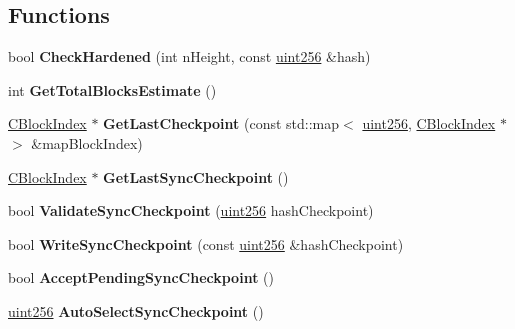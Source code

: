 \subsection*{Functions}
\begin{DoxyCompactItemize}
\item 
\mbox{\label{namespace_checkpoints_a896b098d769129c8e84c511f838baaa7}} 
bool {\bfseries Check\+Hardened} (int n\+Height, const \mbox{\hyperlink{classuint256}{uint256}} \&hash)
\item 
\mbox{\label{namespace_checkpoints_ac4dc0a0ba00009be52fee3eef694c2c0}} 
int {\bfseries Get\+Total\+Blocks\+Estimate} ()
\item 
\mbox{\label{namespace_checkpoints_ad91375160e77c30d6e6ccbfe1c682195}} 
\mbox{\hyperlink{class_c_block_index}{C\+Block\+Index}} $\ast$ {\bfseries Get\+Last\+Checkpoint} (const std\+::map$<$ \mbox{\hyperlink{classuint256}{uint256}}, \mbox{\hyperlink{class_c_block_index}{C\+Block\+Index}} $\ast$ $>$ \&map\+Block\+Index)
\item 
\mbox{\label{namespace_checkpoints_a6cadddff358b499f440031e2a7742f83}} 
\mbox{\hyperlink{class_c_block_index}{C\+Block\+Index}} $\ast$ {\bfseries Get\+Last\+Sync\+Checkpoint} ()
\item 
\mbox{\label{namespace_checkpoints_ac6574fbf8b628b97e16c654e7a33dc5a}} 
bool {\bfseries Validate\+Sync\+Checkpoint} (\mbox{\hyperlink{classuint256}{uint256}} hash\+Checkpoint)
\item 
\mbox{\label{namespace_checkpoints_a05fbd0d061c0a17e6b9dab5c504514f1}} 
bool {\bfseries Write\+Sync\+Checkpoint} (const \mbox{\hyperlink{classuint256}{uint256}} \&hash\+Checkpoint)
\item 
\mbox{\label{namespace_checkpoints_a01c23da1c0dd0281ef17ce2aec29fb52}} 
bool {\bfseries Accept\+Pending\+Sync\+Checkpoint} ()
\item 
\mbox{\label{namespace_checkpoints_a640698220ee22f3459c6a6b2938b8922}} 
\mbox{\hyperlink{classuint256}{uint256}} {\bfseries Auto\+Select\+Sync\+Checkpoint} ()

\end{DoxyCompactItemize}
